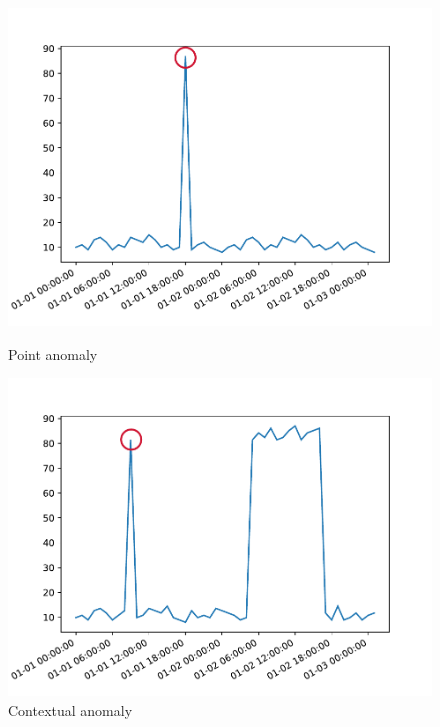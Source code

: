 \begin{figure}[H]
	\begin{minipage}{.475\textwidth}
		\includegraphics[width=\textwidth, clip, trim=0cm 0.5cm 1cm 1cm]{Resources/Images/Images/Anomalies/point_anomaly.pdf}
		\caption{Point anomaly}
		\label{fig:images:point_anomaly}
	\end{minipage}
	\hspace{0.05\textwidth}
	\begin{minipage}{.475\textwidth}
		\includegraphics[width=\textwidth, clip, trim=0cm 0.5cm 1cm 1cm]{Resources/Images/Images/Anomalies/contextual_anomaly.pdf}
		\caption{Contextual anomaly}
		\label{fig:images:contextual_anomaly}
	\end{minipage}
\end{figure}


